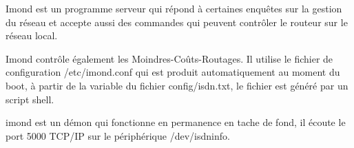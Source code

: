 

  Imond est un programme serveur qui répond à certaines enquêtes sur
  la gestion du réseau et accepte aussi des commandes qui peuvent contrôler
  le routeur sur le réseau local.

  Imond contrôle également les Moindres-Coûts-Routages. Il utilise
  le fichier de configuration /etc/imond.conf qui est produit
  automatiquement au moment du boot, à partir de la variable 
  du fichier config/isdn.txt, le fichier est généré par un script shell.

  imond est un démon qui fonctionne en permanence en tache de fond,
  il écoute le port 5000 TCP/IP sur le périphérique /dev/isdninfo.

